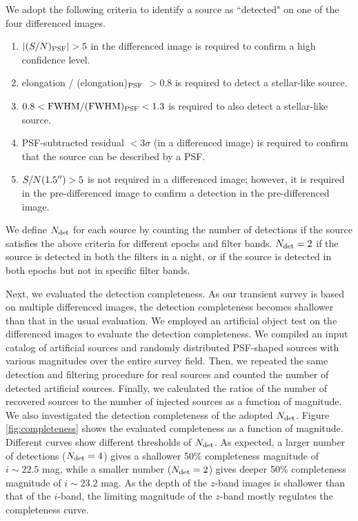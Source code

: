 \documentclass[]{pasj01}
\begin{document}
We adopt the following criteria to identify a source as ``detected" on one of the four differenced images.
\begin{enumerate}
\item $|(S/N)_{\rm PSF}| > 5$ in the differenced image is required to  confirm a high confidence level.
\item elongation / (elongation)$_{\rm PSF}$ $> 0.8$ is required to detect a stellar-like source.
\item $0.8 < {\rm FWHM}/{\rm (FWHM)_{PSF}} < 1.3$ is required to also detect a stellar-like source.
\item PSF-subtracted residual $< 3\sigma$ (in a differenced image) is required to confirm that the source can be described by a PSF.
\item $S/N({\rm 1.5^{\prime\prime}}) > 5$ is not required in a differenced image; however, it is required in the pre-differenced image to confirm a detection in the pre-differenced image.
\end{enumerate}
We define $N_{\rm det}$  for each source by counting the number of detections if the source satisfies the above criteria for different epochs and filter bands. $N_{\rm det}=2$ if the source is detected in both the filters in a night, or if the source is detected in both epochs but not in specific filter bands.


Next, we evaluated the detection completeness.
As our transient survey is based on multiple differenced images,
the detection completeness becomes shallower than that in the usual evaluation.
We employed an artificial object test on the differenced images to evaluate the detection completeness.
We compiled an input catalog of artificial sources
and randomly distributed PSF-shaped sources  with various magnitudes over the entire survey field.
Then, we repeated the same detection and filtering procedure for real sources
and counted the number of detected artificial sources.
Finally, we calculated the ratios of the number of recovered sources to  the number of injected sources  as a function of magnitude.
We also investigated the detection completeness of the adopted $N_{\rm det}$.
Figure \ref{fig:completeness} shows the evaluated completeness as a function of magnitude.
Different curves show different thresholds of $N_{\rm det}$.
As expected, a larger number of detections ($N_{\rm det}=4$) gives a shallower 50\% completeness magnitude of $i\sim22.5$ mag,
while a smaller number ($N_{\rm det}=2$) gives deeper 50\% completeness magnitude of $i\sim23.2$ mag.
As the depth of the $z$-band images is shallower than that of the $i$-band,
the limiting magnitude of the $z$-band mostly regulates the completeness curve.
\end{document}
